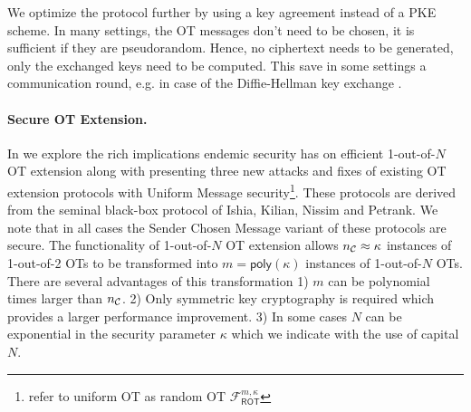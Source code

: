 We optimize the protocol further by using a key agreement instead of a PKE scheme. In many settings, the OT messages don't need to be chosen, it is sufficient if they are pseudorandom. Hence, no ciphertext needs to be generated, only the exchanged keys need to be computed. This save in some settings a communication round, e.g. in case of the Diffie-Hellman key exchange \cite{DifHel76}.

\paragraph{Secure OT Extension.} 
In  we explore the rich implications endemic security has on efficient 1-out-of-$N$ OT extension along with presenting three new attacks and fixes of existing OT extension protocols\cite{C:KelOrsSch15,RSA:OrrOrsSch17} with Uniform Message security\footnote{\cite{C:KelOrsSch15,RSA:OrrOrsSch17} refer to uniform OT as random OT $\mathcal{F}^{m,\kappa}_{\textsf{ROT}}$}. 
\iffullversion
These protocols are derived from the seminal black-box protocol of Ishia, Kilian, Nissim and Petrank\cite{C:IKNP03}. We note that in all cases the Sender Chosen Message variant of these protocols\cite{C:IKNP03,C:KelOrsSch15,RSA:OrrOrsSch17} are secure. 
\fi
The functionality of 1-out-of-$N$ OT extension allows ${n_\mathcal{C}}\approx\kappa$ instances of 1-out-of-2 OTs to be transformed into $m=\textsf{poly}(\kappa)$ instances of 1-out-of-$N$ OTs. There are several advantages of this transformation 1) $m$ can be polynomial times larger than ${n_\mathcal{C}}$. 2) Only symmetric key cryptography is required which provides a larger performance improvement. 3) In some cases $N$ can be exponential in the security parameter $\kappa$ which we indicate with the use of capital $N$. 

